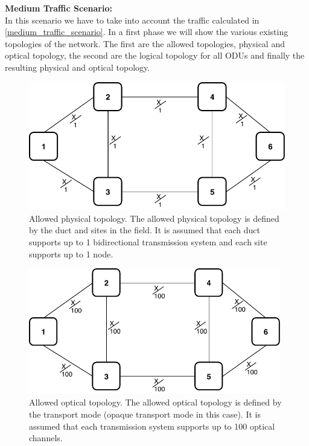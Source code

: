 \vspace{15pt}
\textbf{Medium Traffic Scenario:}\\

In this scenario we have to take into account the traffic calculated in \ref{medium_traffic_scenario}. In a first phase we will show the various existing topologies of the network. The first are the allowed topologies, physical and optical topology, the second are the logical topology for all ODUs and finally the resulting physical and optical topology.\\

\begin{figure}[h!]
\centering
\includegraphics[width=12cm]{sdf/ilp/opaque_protection/figures/allowed_physical_topology}
\caption{Allowed physical topology. The allowed physical topology is defined by the duct and sites in the field. It is assumed that each duct supports up to 1 bidirectional transmission system and each site supports up to 1 node.}
\label{allowed_physical_protectionmedium}
\end{figure}

\newpage
\begin{figure}[h!]
\centering
\includegraphics[width=11cm]{sdf/ilp/opaque_protection/figures/allowed_optical_topology}
\caption{Allowed optical topology. The allowed optical topology is defined by the transport mode (opaque transport mode in this case). It is assumed that each transmission system supports up to 100 optical channels.}
\label{allowed_optical_protectionmedium}
\end{figure}

